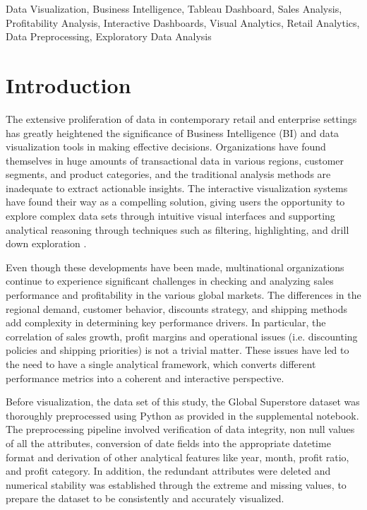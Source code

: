 \documentclass[conference]{IEEEtran}
\begin{document}
\begin{IEEEkeywords}
Data Visualization, Business Intelligence, Tableau Dashboard, Sales Analysis, Profitability Analysis, Interactive Dashboards, Visual Analytics, Retail Analytics, Data Preprocessing, Exploratory Data Analysis
\end{IEEEkeywords}


\section{Introduction}
The extensive proliferation of data in contemporary retail and enterprise settings has greatly heightened the significance of Business Intelligence (BI) and data visualization tools in making effective decisions. Organizations have found themselves in huge amounts of transactional data in various regions, customer segments, and product categories, and the traditional analysis methods are inadequate to extract actionable insights. The interactive visualization systems have found their way as a compelling solution, giving users the opportunity to explore complex data sets through intuitive visual interfaces and supporting analytical reasoning through techniques such as filtering, highlighting, and drill down exploration \cite{few2006information, shneiderman1996eyes}.

Even though these developments have been made, multinational organizations continue to experience significant challenges in checking and analyzing sales performance and profitability in the various global markets. The differences in the regional demand, customer behavior, discounts strategy, and shipping methods add complexity in determining key performance drivers. In particular, the correlation of sales growth, profit margins and operational issues (i.e. discounting policies and shipping priorities) is not a trivial matter. These issues have led to the need to have a single analytical framework, which converts different performance metrics into a coherent and interactive perspective.

Before visualization, the data set of this study, the Global Superstore dataset was thoroughly preprocessed using Python as provided in the supplemental notebook. The preprocessing pipeline involved verification of data integrity, non null values of all the attributes, conversion of date fields into the appropriate datetime format and derivation of other analytical features like year, month, profit ratio, and profit category. In addition, the redundant attributes were deleted and numerical stability was established through the extreme and missing values, to prepare the dataset to be consistently and accurately visualized.
\end{document}
